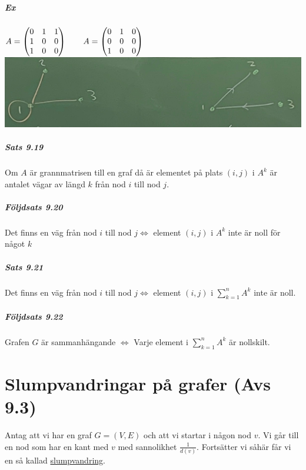 \paragraph{Ex}
$A=\begin{pmatrix}
    0&1&1\\
    1&0&0\\
    1&0&0
\end{pmatrix}
\text{\hspace{20px}}
A=\begin{pmatrix}
    0&1&0\\
    0&0&0\\
    1&0&0
\end{pmatrix}$\\
\includegraphics[scale=0.14]{imgs/img03.png}

\paragraph{Sats 9.19} Om $A$ är grannmatrisen till en graf då är elementet på plats $(i,j)$ i $A^k$ är antalet vägar av längd $k$ från nod $i$ till nod $j$.

\paragraph{Följdsats 9.20} Det finns en väg från nod $i$ till nod $j \Leftrightarrow$ element $(i,j)$ i $A^k$ inte är noll för något $k$

\paragraph{Sats 9.21} Det finns en väg från nod $i$ till nod $j \Leftrightarrow$ element $(i,j)$ i $\sum^n_{k=1}A^k$ inte är noll.

\paragraph{Följdsats 9.22} Grafen $G$ är sammanhängande $\Leftrightarrow$ Varje element i $\sum^n_{k=1}A^k$ är nollskilt.

\chapter{Slumpvandringar på grafer (Avs 9.3)}
Antag att vi har en graf $G=(V,E)$ och att vi startar i någon nod $v$.
Vi går till en nod som har en kant med $v$ med sannolikhet $\frac{1}{d(v)}$.
Fortsätter vi såhär får vi en så kallad \underline{slumpvandring}.


